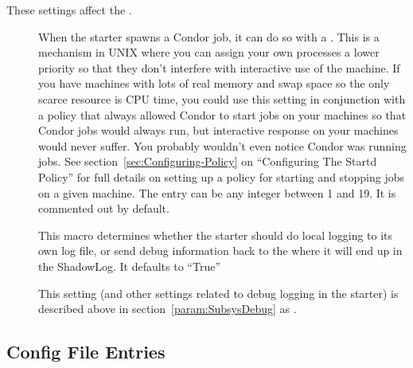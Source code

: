 These settings affect the .
\begin{description}

\item[] \label{param:JobReniceIncrement}
  When the starter spawns a Condor job, it can do so with a
  .  This is a mechanism in UNIX where you can assign
  your own processes a lower priority so that they don't interfere
  with interactive use of the machine.  If you have machines with lots
  of real memory and swap space so the only scarce resource is CPU
  time, you could use this setting in conjunction with a policy that
  always allowed Condor to start jobs on your machines so that Condor
  jobs would always run, but interactive response on your machines
  would never suffer.  You probably wouldn't even notice Condor was
  running jobs.  See section~\ref{sec:Configuring-Policy} on
  ``Configuring The Startd Policy'' for full details on setting up a
  policy for starting and stopping jobs on a given machine.  The entry
  can be any integer between 1 and 19.  It is commented out by
  default.

\item[]
  \label{param:StarterLocalLogging} This macro determines whether the
  starter should do local logging to its own log file, or send debug
  information back to the  where it will end up in the
  ShadowLog.  It defaults to ``True''

\item[] \label{param:StarterDebug} This setting
  (and other settings related to debug logging in the starter) is
  described above in section~\ref{param:SubsysDebug} as
  .

\end{description}

\subsection{\label{sec:Submit-Config-File-Entries}
 Config File Entries}

